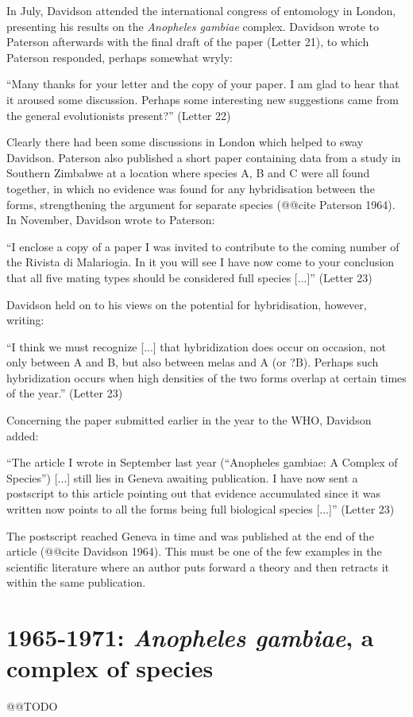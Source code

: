 \documentclass[a4paper,11pt,abstracton,hidelinks]{scrartcl}
\begin{document}
In July, Davidson attended the international congress of entomology in London, presenting his results on the \textit{Anopheles gambiae} complex. Davidson wrote to Paterson afterwards with the final draft of the paper (Letter 21), to which Paterson responded, perhaps somewhat wryly:


\begin{displayquote}
``Many thanks for your letter and the copy of your paper. I am glad to hear that it aroused some discussion. Perhaps some interesting new suggestions came from the general evolutionists present?'' (Letter 22)
\end{displayquote}


Clearly there had been some discussions in London which helped to sway Davidson. Paterson also published a short paper containing data from a study in Southern Zimbabwe at a location where species A, B and C were all found together, in which no evidence was found for any hybridisation between the forms, strengthening the argument for separate species (@@cite Paterson 1964). In November, Davidson wrote to Paterson:


\begin{displayquote}
``I enclose a copy of a paper I was invited to contribute to the coming number of the Rivista di Malariogia. In it you will see I have now come to your conclusion that all five mating types should be considered full species [...]'' (Letter 23)
\end{displayquote}


Davidson held on to his views on the potential for hybridisation, however, writing:


\begin{displayquote}
``I think we must recognize [...] that hybridization does occur on occasion, not only between A and B, but also between melas and A (or ?B). Perhaps such hybridization occurs when high densities of the two forms overlap at certain times of the year.'' (Letter 23)
\end{displayquote}


Concerning the paper submitted earlier in the year to the WHO, Davidson added:


\begin{displayquote}
``The article I wrote in September last year (``Anopheles gambiae: A Complex of Species'') [...] still lies in Geneva awaiting publication. I have now sent a postscript to this article pointing out that evidence accumulated since it was written now points to all the forms being full biological species [...]'' (Letter 23)
\end{displayquote}


The postscript reached Geneva in time and was published at the end of the article (@@cite Davidson 1964). This must be one of the few examples in the scientific literature where an author puts forward a theory and then retracts it within the same publication.


\section{1965-1971: \textit{Anopheles gambiae}, a complex of species}


@@TODO


\printbibliography
\end{document}
